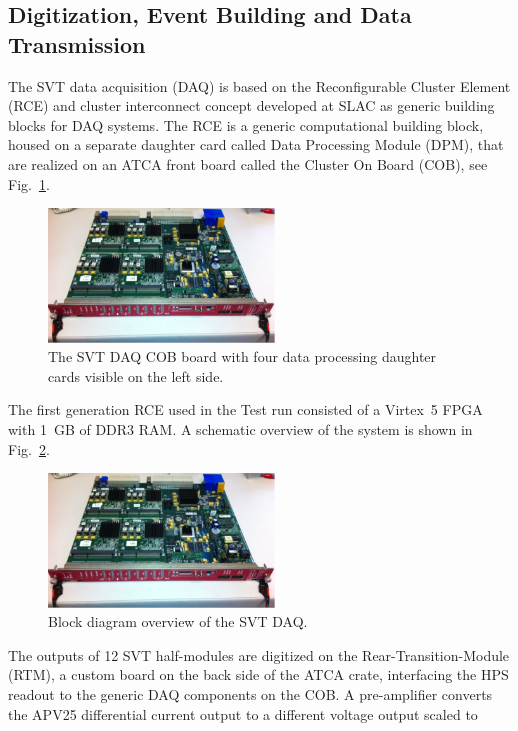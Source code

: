\documentclass[final,3p,times,twocolumn]{elsarticle}
\begin{document}
\subsection{Digitization, Event Building and Data Transmission}
\label{sec:svt_daq}
The SVT data acquisition (DAQ) is based on the Reconfigurable Cluster Element (RCE) and cluster 
interconnect concept developed at SLAC as generic building blocks for DAQ systems. 
The RCE is a generic computational building block, housed on a separate daughter card called 
Data Processing Module (DPM), that are realized on an ATCA front board called the Cluster On Board 
(COB), see Fig.~\ref{fig:cob}.
 \begin{figure}[]
\begin{center}
{\small
	\includegraphics[width=6cm]{figures/svt_daq_module}
	\caption{The SVT DAQ COB board with four data processing daughter cards visible on the left side.}
	\label{fig:cob}
}
\end{center}
\end{figure}
The first generation RCE used in the Test run consisted of a Virtex~5 FPGA with 1~GB of DDR3 RAM. 
A schematic overview of the system is shown in Fig.~\ref{fig:svtdaq}. 
 \begin{figure}[]
\begin{center}
{\small
	\includegraphics[width=6cm]{figures/svt_daq_module}
	\caption{Block diagram overview of the SVT DAQ.}
	\label{fig:svtdaq}
}
\end{center}
\end{figure}
The outputs of 12 SVT half-modules are digitized on the Rear-Transition-Module (RTM), a custom board 
on the back side of the ATCA crate, interfacing the HPS readout to the generic DAQ components on the 
COB. A pre-amplifier converts the APV25 differential current output to a different voltage output scaled to 
\end{document}
